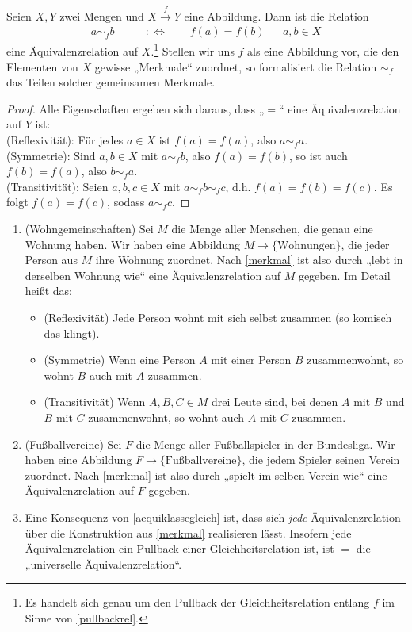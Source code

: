 \begin{bem} \label{merkmal}
    Seien $X,Y$ zwei Mengen und $X\xrightarrow{f} Y$ eine Abbildung. Dann ist die Relation
    \begin{align*}
        a \sim_f b \qquad&:\Leftrightarrow\qquad f(a)=f(b) && a,b\in X
    \end{align*}
    eine Äquivalenzrelation auf $X$.\footnote{Es handelt sich genau um den Pullback der Gleichheitsrelation entlang $f$ im Sinne von \cref{pullbackrel}.} Stellen wir uns $f$ als eine Abbildung vor, die den Elementen von $X$ gewisse „Merkmale“ zuordnet, so formalisiert die Relation $\sim_f$ das Teilen solcher gemeinsamen Merkmale.
\end{bem}
\begin{proof}
    Alle Eigenschaften ergeben sich daraus, dass „$=$“ eine Äquivalenzrelation auf $Y$ ist: \\[0.5em]
    (Reflexivität): Für jedes $a\in X$ ist $f(a)=f(a)$, also $a\sim_f a$. \\[0.5em]
    (Symmetrie): Sind $a,b\in X$ mit $a\sim_f b$, also $f(a)=f(b)$, so ist auch $f(b)=f(a)$, also $b\sim_f a$. \\[0.5em]
    (Transitivität): Seien $a,b,c\in X$ mit $a\sim_f b\sim_f c$, d.h. $f(a)=f(b)=f(c)$. Es folgt  $f(a)=f(c)$, sodass $a\sim_f c$.
\end{proof}


\begin{bsp} \quad
    \begin{enumerate}
        \item(Wohngemeinschaften) Sei $M$ die Menge aller Menschen, die genau eine Wohnung haben. Wir haben eine Abbildung $M\to \{\text{Wohnungen}\}$, die jeder Person aus $M$ ihre Wohnung zuordnet. Nach \cref{merkmal} ist also durch „lebt in derselben Wohnung wie“ eine Äquivalenzrelation auf $M$ gegeben. Im Detail heißt das:
        \begin{itemize}
            \item(Reflexivität) Jede Person wohnt mit sich selbst zusammen (so komisch das klingt).
            \item(Symmetrie) Wenn eine Person $A$ mit einer Person $B$ zusammenwohnt, so wohnt $B$ auch mit $A$ zusammen.
            \item(Transitivität) Wenn $A,B,C\in M$ drei Leute sind, bei denen $A$ mit $B$ und $B$ mit $C$ zusammenwohnt, so wohnt auch $A$ mit $C$ zusammen.
        \end{itemize}
        \item(Fußballvereine) Sei $F$ die Menge aller Fußballspieler in der Bundesliga. Wir haben eine Abbildung $F\to\{\text{Fußballvereine}\}$, die jedem Spieler seinen Verein zuordnet. Nach \cref{merkmal} ist also durch „spielt im selben Verein wie“ eine Äquivalenzrelation auf $F$ gegeben.
        \item Eine Konsequenz von \cref{aequiklassegleich} ist, dass sich \emph{jede} Äquivalenzrelation über die Konstruktion aus \cref{merkmal} realisieren lässt. Insofern jede Äquivalenzrelation ein Pullback einer Gleichheitsrelation ist, ist $=$ die „universelle Äquivalenzrelation“.
    \end{enumerate}
\end{bsp}


